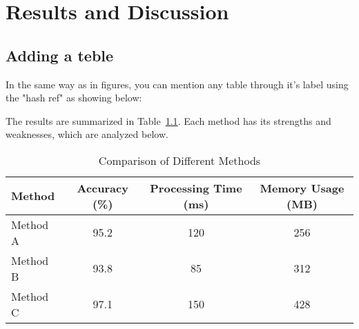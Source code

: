 \chapter{Results and Discussion}

\section{Adding a teble}

In the same way as in figures, you can mention any table through it's label using the "hash ref" as showing below:

The results are summarized in Table~\ref{tab:comparison}. Each method has its strengths and weaknesses, which are analyzed below.


\begin{table}[htbp] 
    \centering
    \caption{Comparison of Different Methods} %
    \label{tab:comparison}
    \begin{tabular}{@{}lccc@{}}
        \toprule
        \textbf{Method} & \textbf{Accuracy (\%)} & \textbf{Processing Time (ms)} & \textbf{Memory Usage (MB)} \\
        \midrule
        Method A & 95.2 & 120 & 256 \\
        Method B & 93.8 & 85 & 312 \\
        Method C & 97.1 & 150 & 428 \\
        \bottomrule
    \end{tabular}
\end{table}
